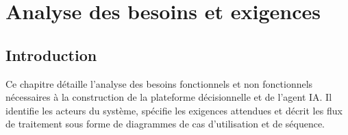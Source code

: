\documentclass[a4paper,12pt]{report}
\begin{document}
\chapter{Analyse des besoins et exigences}

\section*{Introduction}
\begin{doublespace}
Ce chapitre détaille l'analyse des besoins fonctionnels et non fonctionnels nécessaires à la construction de la plateforme décisionnelle et de l'agent IA. Il identifie les acteurs du système, spécifie les exigences attendues et décrit les flux de traitement sous forme de diagrammes de cas d'utilisation et de séquence.
\end{doublespace}
\end{document}
